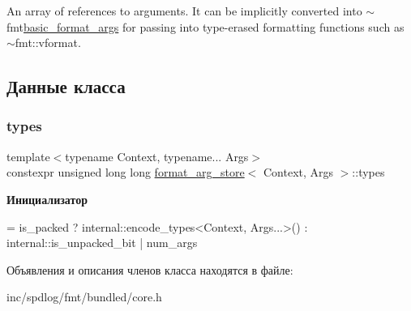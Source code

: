 An array of references to arguments. It can be implicitly converted into {\ttfamily $\sim$fmt\hyperlink{classbasic__format__args}{basic\+\_\+format\+\_\+args}} for passing into type-\/erased formatting functions such as {\ttfamily $\sim$fmt\+::vformat}.  

\subsection{Данные класса}
\mbox{\label{classformat__arg__store_aa68b8300886c4203a390ded3ad056254}} 
\subsubsection{\texorpdfstring{types}{types}}
{\footnotesize\ttfamily template$<$typename Context, typename... Args$>$ \\
constexpr unsigned long long \hyperlink{classformat__arg__store}{format\+\_\+arg\+\_\+store}$<$ Context, Args $>$\+::types\hspace{0.3cm}{\ttfamily [static]}}

{\bfseries Инициализатор}
\begin{DoxyCode}
=
      is\_packed ? internal::encode\_types<Context, Args...>()
                : internal::is\_unpacked\_bit | num\_args
\end{DoxyCode}


Объявления и описания членов класса находятся в файле\+:\begin{DoxyCompactItemize}
\item 
inc/spdlog/fmt/bundled/core.\+h\end{DoxyCompactItemize}
